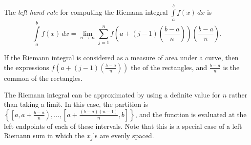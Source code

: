 \documentclass[12pt]{article}
\begin{document}
The \emph{left hand rule} for computing the Riemann integral $\displaystyle \int\limits_a^b f(x) \, dx$ is
\[
\int\limits_a^b f(x) \, dx = \lim_{n \to \infty} \sum_{j=1}^n f \left( a+(j-1) \left( \frac{b-a}{n} \right) \right) \left( \frac{b-a}{n} \right).
\]

If the Riemann integral is considered as a measure of area under a curve, then the expressions $\displaystyle f \left( a+(j-1) \left( \frac{b-a}{n} \right) \right)$  the  of the rectangles, and $\displaystyle \frac{b-a}{n}$ is the common  of the rectangles.

The Riemann integral can be approximated by using a definite value for $n$ rather than taking a limit.  In this case, the partition is $\displaystyle \left\{ \left[ a, a+\frac{b-a}{n} \right) , \dots , \left[ a+\frac{(b-a)(n-1)}{n}, b \right] \right\}$, and the function is evaluated at the left endpoints of each of these intervals.  Note that this is a special case of a left Riemann sum in which the $x_j$'s are evenly spaced.
\end{document}
